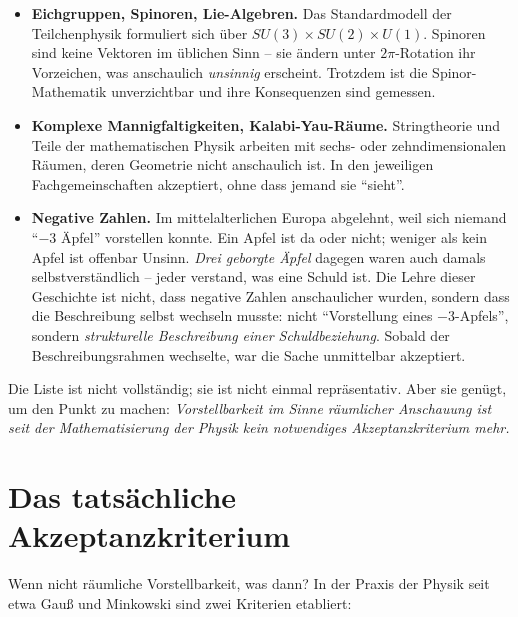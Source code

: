 \begin{itemize}[leftmargin=2em,itemsep=4pt,topsep=4pt]
  \item \textbf{Eichgruppen, Spinoren, Lie-Algebren.} Das
        Standardmodell der Teilchenphysik formuliert sich über
        $SU(3) \times SU(2) \times U(1)$. Spinoren sind keine
        Vektoren im üblichen Sinn -- sie ändern unter $2\pi$-Rotation
        ihr Vorzeichen, was anschaulich \emph{unsinnig} erscheint.
        Trotzdem ist die Spinor-Mathematik unverzichtbar und ihre
        Konsequenzen sind gemessen.

  \item \textbf{Komplexe Mannigfaltigkeiten, Kalabi-Yau-Räume.}
        Stringtheorie und Teile der mathematischen Physik arbeiten
        mit sechs- oder zehndimensionalen Räumen, deren Geometrie
        nicht anschaulich ist. In den jeweiligen Fachgemeinschaften
        akzeptiert, ohne dass jemand sie \enquote{sieht}.

  \item \textbf{Negative Zahlen.} Im mittelalterlichen Europa
        abgelehnt, weil sich niemand \enquote{$-3$ Äpfel} vorstellen
        konnte. Ein Apfel ist da oder nicht; weniger als kein Apfel
        ist offenbar Unsinn. \emph{Drei geborgte Äpfel} dagegen
        waren auch damals selbstverständlich -- jeder verstand, was
        eine Schuld ist. Die Lehre dieser Geschichte ist nicht, dass
        negative Zahlen anschaulicher wurden, sondern dass die
        Beschreibung selbst wechseln musste: nicht
        \enquote{Vorstellung eines $-3$-Apfels}, sondern
        \emph{strukturelle Beschreibung einer Schuldbeziehung}.
        Sobald der Beschreibungsrahmen wechselte, war die Sache
        unmittelbar akzeptiert.
\end{itemize}

Die Liste ist nicht vollständig; sie ist nicht einmal repräsentativ.
Aber sie genügt, um den Punkt zu machen: \emph{Vorstellbarkeit im
Sinne räumlicher Anschauung ist seit der Mathematisierung der Physik
kein notwendiges Akzeptanzkriterium mehr.}

\section{Das tatsächliche Akzeptanzkriterium}

Wenn nicht räumliche Vorstellbarkeit, was dann? In der Praxis der
Physik seit etwa Gauß und Minkowski sind zwei Kriterien etabliert:


